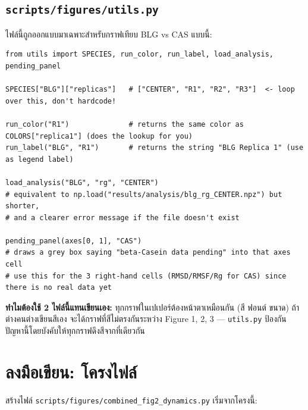 \documentclass[11pt,a4paper]{article}
\begin{document}
\subsection{\texttt{scripts/figures/utils.py}}
ไฟล์นี้ถูกออกแบบมาเฉพาะสำหรับกราฟเทียบ BLG vs CAS แบบนี้:
\begin{lstlisting}
from utils import SPECIES, run_color, run_label, load_analysis, pending_panel

SPECIES["BLG"]["replicas"]   # ["CENTER", "R1", "R2", "R3"]  <- loop over this, don't hardcode!

run_color("R1")              # returns the same color as COLORS["replica1"] (does the lookup for you)
run_label("BLG", "R1")       # returns the string "BLG Replica 1" (use as legend label)

load_analysis("BLG", "rg", "CENTER")
# equivalent to np.load("results/analysis/blg_rg_CENTER.npz") but shorter,
# and a clearer error message if the file doesn't exist

pending_panel(axes[0, 1], "CAS")
# draws a grey box saying "beta-Casein data pending" into that axes cell
# use this for the 3 right-hand cells (RMSD/RMSF/Rg for CAS) since there is no real data yet
\end{lstlisting}

\textbf{ทำไมต้องใช้ 2 ไฟล์นี้แทนเขียนเอง:} ทุกกราฟในเปเปอร์ต้องหน้าตาเหมือนกัน (สี ฟอนต์ ขนาด)
ถ้าต่างคนต่างเขียนสีเอง จะได้กราฟที่สีไม่ตรงกันระหว่าง Figure 1, 2, 3 — \texttt{utils.py} ป้องกัน
ปัญหานี้โดยบังคับให้ทุกกราฟดึงสีจากที่เดียวกัน

\section{ลงมือเขียน: โครงไฟล์}
สร้างไฟล์ \texttt{scripts/figures/combined\_fig2\_dynamics.py} เริ่มจากโครงนี้:
\end{document}

